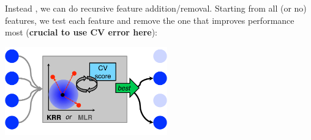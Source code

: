 Instead , we can do recursive feature addition/removal. Starting from all (or no) features, we test each feature and remove the one that improves performance most (\textbf{crucial to use CV error here}):
\pause{}
\begin{center}
	\includegraphics[width=7.0cm]{representations/images/wrap}
\end{center}